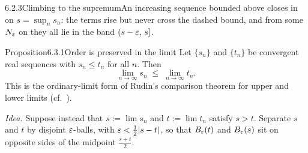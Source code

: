 \documentclass[main.tex]{subfiles}
\begin{document}
\begin{Fig}{6.2.3}{Climbing to the supremum}{An increasing sequence bounded above closes in on $s=\sup_n s_n$: the terms rise but never cross the dashed bound, and from some $N_\varepsilon$ on they all lie in the band $(s-\varepsilon,\,s]$.}
\end{Fig}


\begin{Obj}{Proposition}{6.3.1}{Order is preserved in the limit}
Let $\{s_n\}$ and $\{t_n\}$ be convergent real sequences with $s_n\le t_n$ for all $n$. Then
\[ \lim_{n\to\infty}s_n \;\le\; \lim_{n\to\infty}t_n . \]
This is the ordinary-limit form of Rudin's comparison theorem for upper and lower limits
(cf.\ ).
\end{Obj}

\noindent\emph{Idea.} Suppose instead that $s:=\lim s_n$ and $t:=\lim t_n$ satisfy $s>t$.
Separate $s$ and $t$ by disjoint $\varepsilon$-balls, with $\varepsilon<\tfrac12|s-t|$, so that $B_{\varepsilon}(t)$
and $B_{\varepsilon}(s)$ sit on opposite sides of the midpoint $\tfrac{s+t}{2}$.
\end{document}
